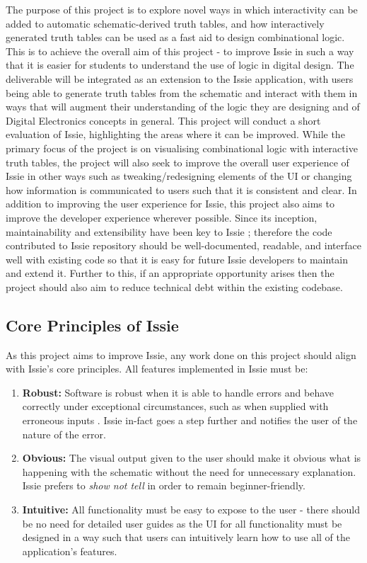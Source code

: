 The purpose of this project is to explore novel ways in which interactivity can be added to automatic schematic-derived truth tables, and how interactively generated truth tables can be used as a fast aid to design combinational logic. This is to achieve the overall aim of this project - to improve Issie in such a way that it is easier for students to understand the use of logic in digital design.
The deliverable will be integrated as an extension to the Issie application, with users being able to generate truth tables from the schematic and interact with them in ways that will augment their understanding of the logic they are designing and of Digital Electronics concepts in general. 
This project will conduct a short evaluation of Issie, highlighting the areas where it can be improved. While the primary focus of the project is on visualising combinational logic with interactive truth tables, the project will also seek to improve the overall user experience of Issie in other ways such as tweaking/redesigning elements of the UI or changing how information is communicated to users such that it is consistent and clear. 
In addition to improving the user experience for Issie, this project also aims to improve the developer experience wherever possible. Since its inception, maintainability and extensibility have been key to Issie \cite{marco_diss}; therefore the code contributed to Issie repository should be well-documented, readable, and interface well with existing code so that it is easy for future Issie developers to maintain and extend it. Further to this, if an appropriate opportunity arises then the project should also aim to reduce technical debt within the existing codebase.

\subsection{Core Principles of Issie} \label{subsec:principles}
As this project aims to improve Issie, any work done on this project should align with Issie's core principles. All features implemented in Issie must be:
\begin{enumerate}
    \item \textbf{Robust:} Software is robust when it is able to handle errors and behave correctly under exceptional circumstances, such as when supplied with erroneous inputs \cite{robust}. Issie in-fact goes a step further and notifies the user of the nature of the error.
    \item \textbf{Obvious:} The visual output given to the user should make it obvious what is happening with the schematic without the need for unnecessary explanation. Issie prefers to \textit{show not tell} in order to remain beginner-friendly.
    \item \textbf{Intuitive:} All functionality must be easy to expose to the user - there should be no need for detailed user guides as the UI for all functionality must be designed in a way such that users can intuitively learn how to use all of the application's features.
\end{enumerate}

